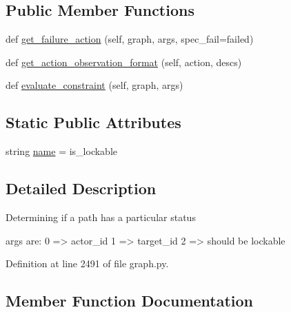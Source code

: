 \subsection*{Public Member Functions}
\begin{DoxyCompactItemize}
\item 
def \hyperlink{classlight__chats_1_1graph_1_1LockableConstraint_a54fa507fa6b123fa5e818b48ab5bf207}{get\+\_\+failure\+\_\+action} (self, graph, args, spec\+\_\+fail=\textquotesingle{}failed\textquotesingle{})
\item 
def \hyperlink{classlight__chats_1_1graph_1_1LockableConstraint_abab472da88c21dc3ea5f7ee874bad9d4}{get\+\_\+action\+\_\+observation\+\_\+format} (self, action, descs)
\item 
def \hyperlink{classlight__chats_1_1graph_1_1LockableConstraint_ab3c3fccadea265252eb3451fae2969e4}{evaluate\+\_\+constraint} (self, graph, args)
\end{DoxyCompactItemize}
\subsection*{Static Public Attributes}
\begin{DoxyCompactItemize}
\item 
string \hyperlink{classlight__chats_1_1graph_1_1LockableConstraint_a7b69d1ba2cd8f2b909299bb5faabc4a6}{name} = \textquotesingle{}is\+\_\+lockable\textquotesingle{}
\end{DoxyCompactItemize}


\subsection{Detailed Description}
\begin{DoxyVerb}Determining if a path has a particular status

args are:
    0 => actor_id
    1 => target_id
    2 => should be lockable
\end{DoxyVerb}
 

Definition at line 2491 of file graph.\+py.



\subsection{Member Function Documentation}
\mbox{\label{classlight__chats_1_1graph_1_1LockableConstraint_ab3c3fccadea265252eb3451fae2969e4}} 
